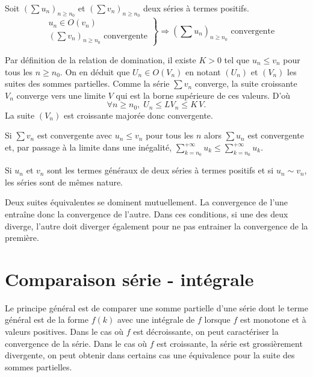 \begin{prop}
  Soit $\left( \sum u_n\right)_{n\geq n_0}$ et $\left( \sum v_n\right)_{n\geq n_0}$ deux séries à termes positifs.
\begin{displaymath}
  \left. 
  \begin{aligned}
    &u_n \in O(v_n) \\ &\left( \sum v_n\right)_{n\geq n_0} \text{ convergente}
  \end{aligned}
  \right\rbrace 
\Rightarrow \left( \sum u_n\right)_{n\geq n_0} \text{ convergente}
\end{displaymath}
\end{prop}
\begin{demo}
Par définition de la relation de domination, il existe $K>0$ tel que $u_n \leq v_n$ pour tous les $n \geq n_0$. On en déduit que $U_n \in O(V_n)$ en notant $(U_n)$ et $(V_n)$ les suites des sommes partielles. Comme la série $\sum v_n$ converge, la suite croissante $V_n$ converge vers une limite $V$ qui est la borne supérieure de ces valeurs. D'où
\[
 \forall n \geq n_0, \; U_n \leq LV_n \leq K\, V.
\]
La suite $(V_n)$ est croissante majorée donc convergente.
\end{demo}
\begin{rem}
 Si $\sum v_n$ est convergente avec $u_n \leq v_n$ pour tous les $n$ alors $\sum u_n$ est convergente et, par passage à la limite dans une inégalité, $\sum_{k=n_0}^{+\infty} u_k \leq \sum_{k=n_0}^{+\infty} u_k$.
\end{rem}

\begin{prop}
  Si $u_n$ et $v_n$ sont les termes généraux de deux séries à termes positifs et si $u_n \sim v_n$, les séries sont de mêmes nature.
\end{prop}
\begin{demo}
  Deux suites équivalentes se dominent mutuellement. La convergence de l'une entraîne donc la convergence de l'autre. Dans ces conditions, si une des deux diverge, l'autre doit diverger également pour ne pas entrainer la convergence de la première.
\end{demo}


\section{Comparaison série - intégrale}
Le principe général est de comparer une somme partielle d'une série dont le terme général est de la forme $f(k)$ avec une intégrale de $f$ lorsque $f$ est monotone et à valeurs positives. Dans le cas où $f$ est décroissante, on peut caractériser la convergence de la série. Dans le cas où $f$ est croissante, la série est grossièrement divergente, on peut obtenir dans certains cas une équivalence pour la suite des sommes partielles.

